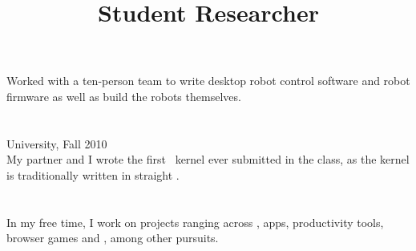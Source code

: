 \begin{resume}
\title{Student Researcher}
\begin{position}
Worked with a ten-person team to write desktop robot control software and
robot firmware as well as build the robots themselves.
\end{position}

\section{}
University, Fall 2010\\
My partner and I wrote the first \kw{\Cplusplus}\ kernel
ever submitted in the class, as the kernel is traditionally written in
straight .




\section{}
In my free time, I work on projects ranging across ,
 apps, productivity tools, browser games and , among other pursuits.

\begin{formatb}
  \\
  \body\\
\end{formatb}


\end{resume}
